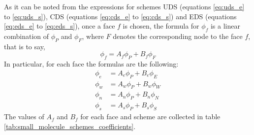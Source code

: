 As it can be noted from the expressions for schemes UDS (equations \eqref{eq:uds_e} to \eqref{eq:uds_s}), CDS (equations \eqref{eq:cds_e} to \eqref{eq:cds_s}) and EDS (equations \eqref{eq:eds_e} to \eqref{eq:eds_s}), once a face $f$ is chosen, the formula for $\phi_f$ is a linear combination of $\phi_P$ and $\phi_F$, where $F$ denotes the corresponding node to the face $f$, that is to say,
\begin{equation} \label{eq:small_molecule_schemes_1}
	\phi_f = A_f \phi_P + B_f \phi_F
\end{equation}
In particular, for each face the formulas are the following:
\begin{align}
	\phi_e &= A_e \phi_P + B_e \phi_E \label{eq:small_molecule_schemes_2} \\ 
	\phi_w &= A_w \phi_P + B_w \phi_W \\ 
	\phi_n &= A_n \phi_P + B_n \phi_N \\ 
	\phi_s &= A_s \phi_P + B_s \phi_S \label{eq:small_molecule_schemes_3} 
\end{align}
The values of $A_f$ and $B_f$ for each face and scheme are collected in table \ref{tab:small_molecule_schemes_coefficients}.
